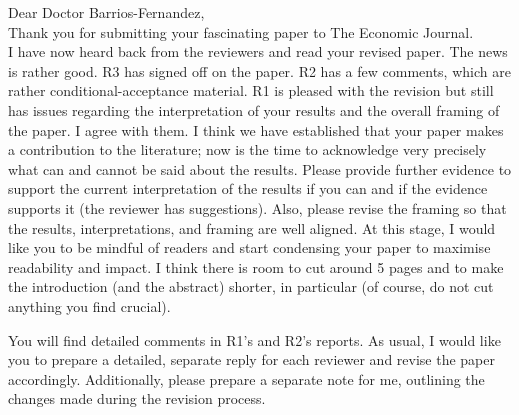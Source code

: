 \begin{bibunit}
\begin{editorcomment}

Dear Doctor Barrios-Fernandez,
\\[6pt]
Thank you for submitting your fascinating paper to The Economic Journal.
\\[6pt]
I have now heard back from the reviewers and read your revised paper. The news is rather good. R3 has signed off on the paper. R2 has a few comments, which are rather conditional-acceptance material. R1 is pleased with the revision but still has issues regarding the interpretation of your results and the overall framing of the paper. I agree with them. I think we have established that your paper makes a contribution to the literature; now is the time to acknowledge very precisely what can and cannot be said about the results. Please provide further evidence to support the current interpretation of the results if you can and if the evidence supports it (the reviewer has suggestions). Also, please revise the framing so that the results, interpretations, and framing are well aligned. At this stage, I would like you to be mindful of readers and start condensing your paper to maximise readability and impact. I think there is room to cut around 5 pages and to make the introduction (and the abstract) shorter, in particular (of course, do not cut anything you find crucial).

You will find detailed comments in R1's and R2's reports. As usual, I would like you to prepare a detailed, separate reply for each reviewer and revise the paper accordingly. Additionally, please prepare a separate note for me, outlining the changes made during the revision process.

\label{pt:editor_01}
\end{editorcomment}

\begin{editorresponse}
	
\end{editorresponse}



\putbib
\end{bibunit}
